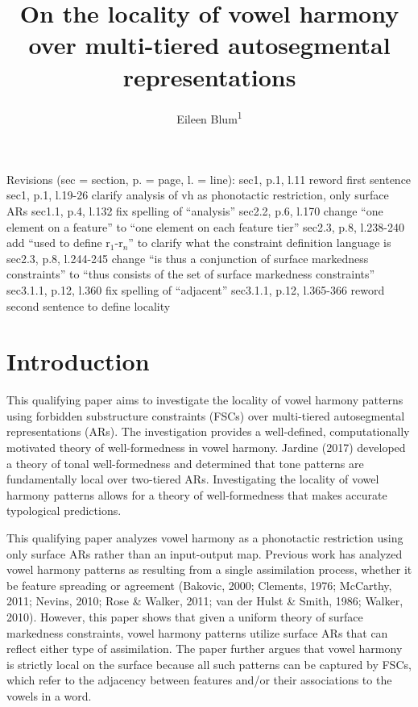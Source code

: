 \documentclass[,doc,floatsintext]{apa6}
\title{On the locality of vowel harmony over multi-tiered autosegmental
representations}
\author{Eileen Blum\textsuperscript{1}}
\date{}
\affiliation{
\vspace{0.5cm}
\textsuperscript{1} Rutgers University}
\theoremstyle{definition}
\theoremstyle{definition}
\theoremstyle{definition}
\theoremstyle{remark}
\begin{document}
\maketitle

Revisions (sec = section, p. = page, l. = line): \newline sec1, p.1,
l.11 reword first sentence \newline sec1, p.1, l.19-26 clarify analysis
of vh as phonotactic restriction, only surface ARs \newline sec1.1, p.4,
l.132 fix spelling of \enquote{analysis} \newline sec2.2, p.6, l.170
change \enquote{one element on a feature} to \enquote{one element on
each feature tier} \newline sec2.3, p.8, l.238-240 add \enquote{used to
define r\(_1\)-r\(_n\)} to clarify what the constraint definition
language is \newline sec2.3, p.8, l.244-245 change \enquote{is thus a
conjunction of surface markedness constraints} to \enquote{thus consists
of the set of surface markedness constraints} \newline sec3.1.1, p.12,
l.360 fix spelling of \enquote{adjacent} \newline sec3.1.1, p.12,
l.365-366 reword second sentence to define locality \newline 

\section{Introduction}\label{introduction}

This qualifying paper aims to investigate the locality of vowel harmony
patterns using forbidden substructure constraints (FSCs) over
multi-tiered autosegmental representations (ARs). The investigation
provides a well-defined, computationally motivated theory of
well-formedness in vowel harmony. Jardine (2017) developed a theory of
tonal well-formedness and determined that tone patterns are
fundamentally local over two-tiered ARs. Investigating the locality of
vowel harmony patterns allows for a theory of well-formedness that makes
accurate typological predictions.

This qualifying paper analyzes vowel harmony as a phonotactic
restriction using only surface ARs rather than an input-output map.
Previous work has analyzed vowel harmony patterns as resulting from a
single assimilation process, whether it be feature spreading or
agreement (Bakovic, 2000; Clements, 1976; McCarthy, 2011; Nevins, 2010;
Rose \& Walker, 2011; van der Hulst \& Smith, 1986; Walker, 2010).
However, this paper shows that given a uniform theory of surface
markedness constraints, vowel harmony patterns utilize surface ARs that
can reflect either type of assimilation. The paper further argues that
vowel harmony is strictly local on the surface because all such patterns
can be captured by FSCs, which refer to the adjacency between features
and/or their associations to the vowels in a word.
\end{document}
